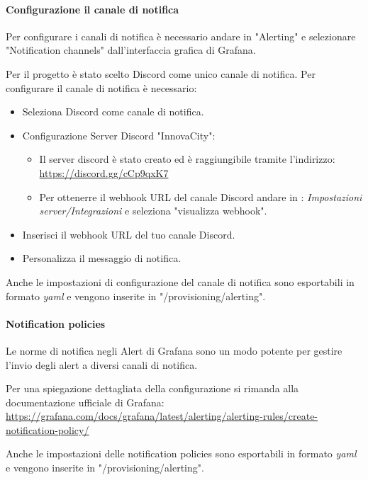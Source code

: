 \paragraph{Configurazione il canale di notifica}
Per configurare i canali di notifica è necessario andare in "Alerting" e selezionare "Notification channels" dall'interfaccia grafica di Grafana.

Per il progetto è stato scelto Discord come unico canale di notifica.
Per configurare il canale di notifica è necessario:
\begin{itemize}
    \item Seleziona Discord come canale di notifica.
    \item Configurazione Server Discord "InnovaCity":
    \begin{itemize}
        \item Il server discord è stato creato ed è raggiungibile tramite l'indirizzo: \href{https://discord.gg/cCp9qxK7}{https://discord.gg/cCp9qxK7}
        \item Per ottenerre il webhook URL del canale Discord andare in : \textit{Impostazioni server/Integrazioni} e seleziona "visualizza webhook".
    \end{itemize}
    \item Inserisci il webhook URL del tuo canale Discord.
    \item Personalizza il messaggio di notifica.
    
\end{itemize}

Anche le impostazioni di configurazione del canale di notifica sono esportabili in formato \textit{yaml} e vengono inserite in "/provisioning/alerting".



\paragraph{Notification policies}
Le norme di notifica negli Alert di Grafana sono un modo potente per gestire l'invio degli alert a diversi canali di notifica.

Per una spiegazione dettagliata della configurazione si rimanda alla documentazione ufficiale di Grafana: \href{https://grafana.com/docs/grafana/latest/alerting/alerting-rules/create-notification-policy/}{https://grafana.com/docs/grafana/latest/alerting/alerting-rules/create-notification-policy/}

Anche le impostazioni delle notification policies sono esportabili in formato \textit{yaml} e vengono inserite in "/provisioning/alerting".

